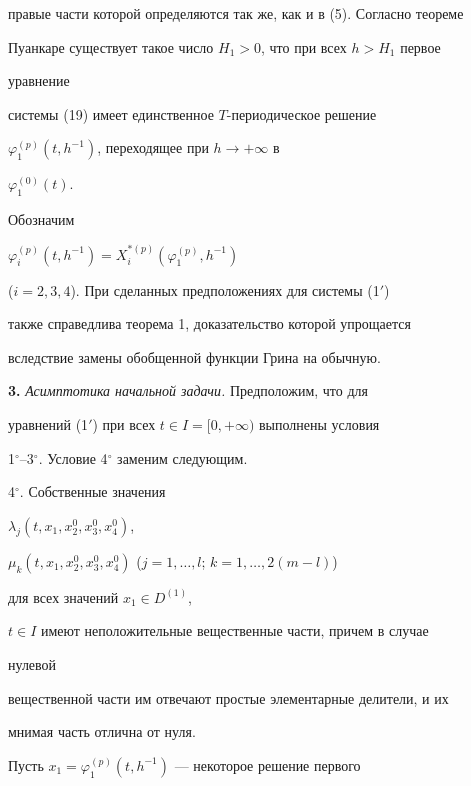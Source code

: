 правые части которой определяются так же, как и в (5). Согласно теореме 


Пуанкаре существует такое число $H_1>0$, что при всех $h>H_1$ первое 


уравнение 


системы (19) имеет единственное $T$-периодическое решение 


$\varphi^{(p)}_1(t,h^{-1})$, переходящее при $h\to+\infty$ в 


$\varphi^{(0)}_1(t)$. 


 


Обозначим 


$\varphi^{(p)}_i(t,h^{-1})=X^{*(p)}_i(\varphi^{(p)}_1,h^{-1})$ 


($i=2,3,4$). При сделанных предположениях для системы (1${}'$) 


также справедлива теорема 1, доказательство которой упрощается 


вследствие замены обобщенной функции Грина на обычную. 


\medskip 


 


{\bf 3.} {\it Асимптотика начальной задачи.} Предположим, что для 


уравнений (1${}'$) при всех $t\in I=[0,+\infty)$ выполнены условия 


1${}^\circ$--3${}^\circ$. Условие 4${}^\circ$ заменим следующим. 


\medskip 


 


4${}^\circ$. Собственные значения 


$\lambda_j(t,x_1,x^0_2,x^0_3,x^0_4)$, 


$\mu_k(t,x_1,x^0_2,x^0_3,x^0_4)$ ($j=1,\dotsc,l$; $k=1,\dotsc,2(m-l)$) 


для всех значений $x_1\in D^{(1)}$, 


$t\in I$ имеют неположительные вещественные части, причем в случае 


нулевой 


вещественной части им отвечают простые элементарные делители, и их 


мнимая часть отлична от нуля. 


\medskip 


 


Пусть $x_1=\varphi^{(p)}_1(t,h^{-1})$ --- некоторое решение первого 


